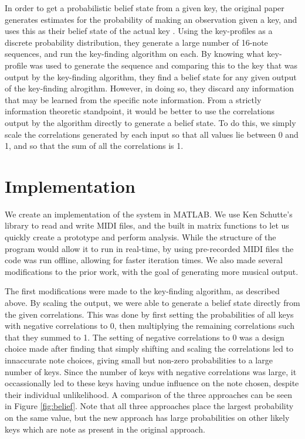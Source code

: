 \documentclass[11pt]{article} %
\begin{document}
In order to get a probabilistic belief state from a given key, the original paper generates estimates for the probability of making an observation given a key, and uses this as their belief state of the actual key \cite{martin2010}. Using the key-profiles as a discrete probability distribution, they generate a large number of 16-note sequences, and run the key-finding algorithm on each. By knowing what key-profile was used to generate the sequence and comparing this to the key that was output by the key-finding algorithm, they find a belief state for any given output of the key-finding alrogithm. However, in doing so, they discard any information that may be learned from the specific note information. From a strictly information theoretic standpoint, it would be better to use the correlations output by the algorithm directly to generate a belief state. To do this, we simply scale the correlations generated by each input so that all values lie between 0 and 1, and so that the sum of all the correlations is 1. 

\section{Implementation}
We create an implementation of the system in MATLAB. We use Ken Schutte's library to read and write MIDI files, and the built in matrix functions to let us quickly create a prototype and perform analysis. While the structure of the program would allow it to run in real-time, by using pre-recorded MIDI files the code was run offline, allowing for faster iteration times. We also made several modifications to the prior work, with the goal of generating more musical output.

The first modifications were made to the key-finding algorithm, as described above. By scaling the output, we were able to generate a belief state directly from the given correlations. This was done by first setting the probabilities of all keys with negative correlations to 0, then multiplying the remaining correlations such that they summed to 1. The setting of negative correlations to 0 was a design choice made after finding that simply shifting and scaling the correlations led to innaccurate note choices, giving small but non-zero probabilities to a large number of keys. Since the number of keys with negative correlations was large, it occassionally led to these keys having undue influence on the note chosen, despite their individual unlikelihood. A comparison of the three approaches can be seen in Figure \ref{fig:belief}. Note that all three approaches place the largest probability on the same value, but the new approach has large probabilities on other likely keys which are note as present in the original approach.
\end{document}
